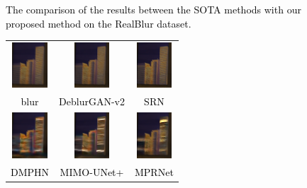 \begin{sloppypar}
\begin{figure}
\begin{tabular}{ccc}
        \end{tabular}
        \caption{\textcolor{black}{The comparison of the results between the SOTA  methods with our proposed method on the RealBlur dataset.}}
        \label{figure10}
        \vspace{-0.5em}
\end{figure}

\begin{figure}
        \center
        \scriptsize
        \begin{tabular}{ccc}
                \includegraphics[width=1.3cm]{./compare_image/blur1.png} &    \includegraphics[width=1.3cm]{./compare_image/DG21.png} &    \includegraphics[width=1.3cm]{./compare_image/SRN1.png}       \\
                \textcolor{black}{blur} & \textcolor{black}{DeblurGAN-v2} & \textcolor{black}{SRN} \\
                
                \includegraphics[width=1.3cm]{./compare_image/DMPHN1.png} &    \includegraphics[width=1.3cm]{./compare_image/MIMO1.png} &    \includegraphics[width=1.3cm]{./compare_image/MPR1.png}       \\
                \textcolor{black}{DMPHN} & \textcolor{black}{MIMO-UNet+} & \textcolor{black}{MPRNet} \\
                


\end{tabular}
\end{figure}
\end{sloppypar}
